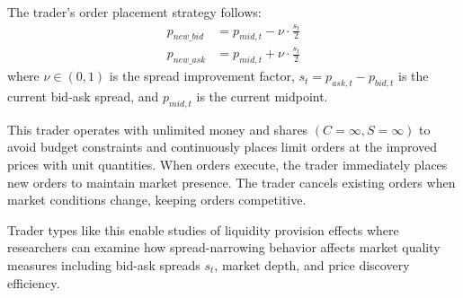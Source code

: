 The trader's order placement strategy follows:
\begin{align}
p_{new\_bid} &= p_{mid,t} - \nu \cdot \frac{s_t}{2} \\
p_{new\_ask} &= p_{mid,t} + \nu \cdot \frac{s_t}{2}
\end{align}
where $\nu \in (0,1)$ is the spread improvement factor, $s_t = p_{ask,t} - p_{bid,t}$ is the current bid-ask spread, and $p_{mid,t}$ is the current midpoint.

This trader operates with unlimited money and shares $(C = \infty, S = \infty)$ to avoid budget constraints and continuously places limit orders at the improved prices with unit quantities. When orders execute, the trader immediately places new orders to maintain market presence. The trader cancels existing orders when market conditions change, keeping orders competitive.

Trader types like this enable studies of liquidity provision effects where researchers can examine how spread-narrowing behavior affects market quality measures including bid-ask spreads $s_t$, market depth, and price discovery efficiency.